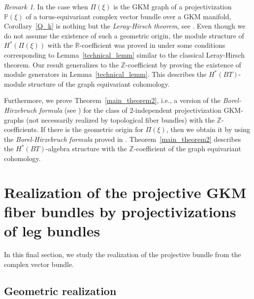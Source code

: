 \documentclass[12pt]{amsart}
\theoremstyle{definition}
\theoremstyle{remark}
\newtheorem{remark}[theorem]{Remark}
\numberwithin{equation}{section}
\begin{document}
\begin{remark}
In the case when $\Pi(\xi)$ is the GKM graph of a projectivization $\mathbb{P}(\xi)$ of a torus-equivariant complex vector bundle over a GKM manifold,
Corollary~\ref{Q_k} is nothing but the {\it Leray-Hirsch theorem}, see \cite[Theorem 4D.1]{H}.
Even though we do not assume the existence of such a geometric origin,
the module structure of $H^{*}(\Pi(\xi))$ with the $\mathbb{R}$-coefficient was proved in \cite[Theorem 3.5]{GSZ} under some conditions corresponding to Lemma~\ref{technical_lemm} similar to the classical Leray-Hirsch theorem.
Our result generalizes \cite[Theorem 3.5]{GSZ} to the $\mathbb{Z}$-coefficient by proving the existence of module generators in Lemma~\ref{technical_lemm}. 
This describes the $H^{*}(BT)$-module structure of the graph equivariant cohomology.

Furthermore, we prove Theorem~\ref{main_theorem2}, i.e., a version of the {\it Borel-Hirzebruch formula} (see \cite[15.1 (3)]{BH}) for the class of $2$-independent projectivization GKM-graphs (not necessarily realized by topological fiber bundles) with the $\mathbb{Z}$-coefficients.
If there is the geometric origin for $\Pi(\xi)$, then we obtain it by using the  {\it Borel-Hirzebruch formula} proved in \cite[15.1 (3)]{BH}.
Theorem~\ref{main_theorem2} describes the $H^{*}(BT)$-algebra structure with the $\mathbb{Z}$-coefficient of the graph equivariant cohomology.
\end{remark}

\section{Realization of the projective GKM fiber bundles by projectivizations of leg bundles}
\label{sect:6}

In this final section, we study the realization of the projective bundle from the complex vector bundle.

\subsection{Geometric realization}
\label{sect:6.1}
\end{document}
